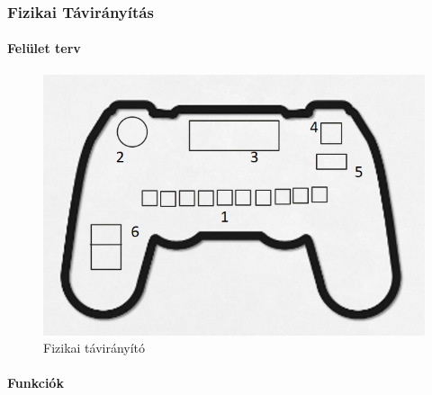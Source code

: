 \documentclass{article}
\begin{document}
\subsubsection{Fizikai Távirányítás}
\paragraph{Felület terv}

\begin{figure}[H]
\centering
\includegraphics[width=1\linewidth]{fizikaitavir_feluletter.png}
\caption{\label{fig:image}Fizikai távirányító}
\end{figure}


\paragraph{Funkciók}
\end{document}
